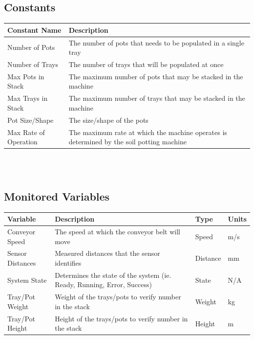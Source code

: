 \documentclass[12pt]{article}
\begin{document}
 \subsection{Constants}
 \begin{tabular}{ |p{4cm}|p{12cm}| }
  \hline
  Constant Name & Description\\
  \hline
  Number of Pots & The number of pots that 
  needs to be populated in a single tray\\
  \hline
  Number of Trays & The number of trays that will be populated at once \\ 
  \hline  
  Max Pots in Stack & The maximum number of 
  pots that may be stacked in the machine\\
  \hline
  Max Trays in Stack & The maximum number of 
  trays that may be stacked in the machine\\
  \hline
  Pot Size/Shape & The size/shape of the pots\\
  \hline
  Max Rate of Operation & The maximum rate at which the machine operates 
  is determined by the soil potting machine \\
  \hline
 \end{tabular}\\\\

 \subsection{Monitored Variables}
 \begin{tabular}{ |p{3cm}|p{9cm}|p{2cm}|p{1cm}| }
  \hline
  Variable & Description & Type & Units\\
  \hline
  Conveyor Speed & The speed at which the conveyor belt will move
   & Speed & m/s\\
  \hline
  Sensor Distances & Measured distances that the sensor identifies
   & Distance & mm\\
  \hline
  System State & Determines the state of the system (ie. Ready, Running, Error, Success)
   & State &  N/A\\
  \hline
  Tray/Pot Weight & Weight of the trays/pots to verify number in the stack
   & Weight & kg\\
  \hline
  Tray/Pot Height & Height of the trays/pots to verify number in the stack
   & Height & m\\
  
  \hline
 \end{tabular}\\\\
\end{document}
